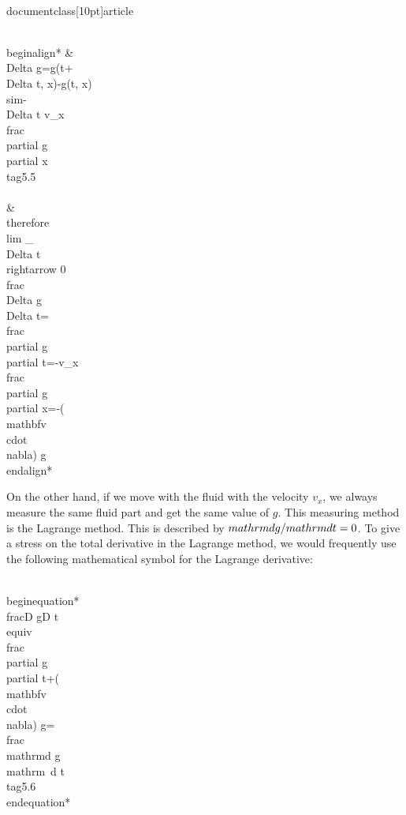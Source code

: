 \\documentclass[10pt]{article}
\begin{document}
\\begin{align*}
& \\Delta g=g(t+\\Delta t, x)-g(t, x) \\sim-\\Delta t v_{x} \\frac{\\partial g}{\\partial x}  \\tag{5.5}\\\\
& \\therefore \\lim _{\\Delta t \\rightarrow 0} \\frac{\\Delta g}{\\Delta t}=\\frac{\\partial g}{\\partial t}=-v_{x} \\frac{\\partial g}{\\partial x}=-(\\mathbf{v} \\cdot \\nabla) g
\\end{align*}


On the other hand, if we move with the fluid with the velocity $v_{x}$, we always measure the same fluid part and get the same value of $g$. This measuring method is the Lagrange method. This is described by $\\mathrm{d} g / \\mathrm{d} t=0$. To give a stress on the total derivative in the Lagrange method, we would frequently use the following mathematical symbol for the Lagrange derivative:


\\begin{equation*}
\\frac{D g}{D t} \\equiv \\frac{\\partial g}{\\partial t}+(\\mathbf{v} \\cdot \\nabla) g=\\frac{\\mathrm{d} g}{\\mathrm{~d} t} \\tag{5.6}
\\end{equation*}
\end{document}
